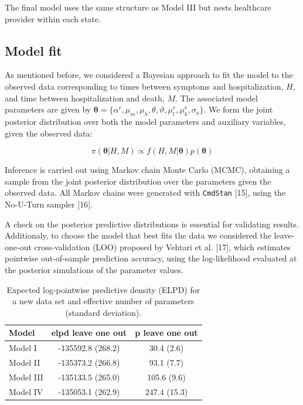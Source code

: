 \documentclass[10pt,letterpaper]{article}
\begin{document}
The final model uses the same structure as Model III but nests
healthcare provider within each state.

\hypertarget{model-fit}{%
\subsection{Model fit}\label{model-fit}}

As mentioned before, we considered a Bayesian approach to fit the model
to the observed data corresponding to times between symptoms and
hospitalization, \(H\), and time between hospitalization and death,
\(M\). The associated model parameters are given by
\(\bm{\theta}=\{\alpha^r,\mu_m,\mu_h,\theta,\vartheta,\mu^r_l,\mu^r_k,\sigma_o\}\).
We form the joint posterior distribution over both the model parameters
and auxiliary variables, given the observed data:

\[
\pi(\bm{\theta}|H,M)\propto f(H,M|\bm{\theta})p(\bm{\theta})
\]

Inference is carried out using Markov chain Monte Carlo (MCMC),
obtaining a sample from the joint posterior distribution over the
parameters given the observed data. All Markov chains were generated
with \texttt{CmdStan} {[}15{]}, using the No-U-Turn sampler {[}16{]}.

A check on the posterior predictive distributions is essential for
validating results. Additionaly, to choose the model that best fits the
data we considered the leave-one-out cross-validation (LOO) proposed by
Vehtari et al. {[}17{]}, which estimates pointwise out-of-sample
prediction accuracy, using the log-likelihood evaluated at the posterior
simulations of the parameter values.

\begin{table}[!htb]
\centering
\begin{tabular}{lcc}
\hline
{\textbf{Model}} & {\textbf{elpd leave one out}} & {\textbf{p leave one out}} \\
\hline Model I    &     -135592.8 (268.2) & 30.4 (2.6) \\
       Model II   &     -135373.2 (266.8) & 93.1 (7.7)\\
       Model III  &     -135133.5 (265.0) & 105.6 (9.6)  \\
       Model IV   &     -135053.1 (262.9) & 247.4 (15.3) \\
\hline
\end{tabular}
\caption{\label{tab:gof} Expected log-pointwise predictive density (ELPD) for a new data set and effective number of parameters (standard deviation).}
\end{table}
\end{document}
